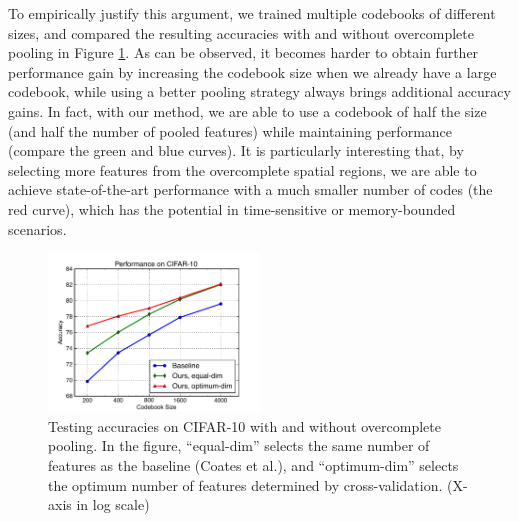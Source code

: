 To empirically justify this argument, we trained multiple codebooks of different sizes, and compared the resulting accuracies with and without overcomplete pooling in Figure \ref{fig:ocpooling}. As can be observed, it becomes harder to obtain further performance gain by increasing the codebook size when we already have a large codebook, while using a better pooling strategy always brings additional accuracy gains. In fact, with our method, we are able to use a codebook of half the size (and half the number of pooled features) while maintaining performance (compare the green and blue curves). It is particularly interesting that, by selecting more features from the overcomplete spatial regions, we are able to achieve state-of-the-art performance with a much smaller number of codes (the red curve), which has the potential in time-sensitive or memory-bounded scenarios.

\begin{figure}
  \centering
  \includegraphics[width=0.5\textwidth]{figs/smartpooling/perf_vs_codes.pdf}
  \caption{Testing accuracies on CIFAR-10 with and without overcomplete pooling. In the figure, ``equal-dim'' selects the same number of features as the baseline (Coates et al.\cite{coates2010aistats}), and ``optimum-dim'' selects the optimum number of features determined by cross-validation. (X-axis in log scale)}
  \label{fig:ocpooling}
\end{figure}

